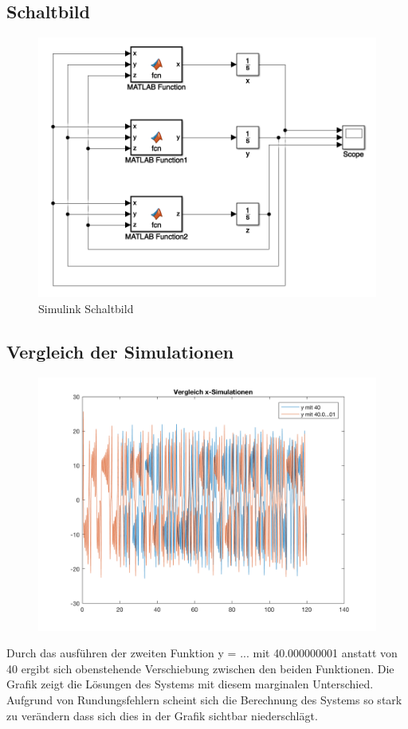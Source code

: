 \documentclass[]{scrartcl}
\begin{document}
\subsection{Schaltbild}
\begin{figure}[H]
	\centering
	\includegraphics[width=1\linewidth]{a1_3_schaltbild}
	\caption{Simulink Schaltbild}
	\label{fig:a1_3_schaltbild}
\end{figure}

\subsection{Vergleich der Simulationen}
\begin{figure}[H]
	\centering
	\includegraphics[width=1\linewidth]{a1_3_2}
	\caption{}
	\label{fig:a1_3_2}
\end{figure}

Durch das ausführen der zweiten Funktion y = ... mit 40.000000001 anstatt von 40 ergibt sich obenstehende Verschiebung zwischen den beiden Funktionen. Die Grafik zeigt die Lösungen des Systems mit diesem marginalen Unterschied. Aufgrund von Rundungsfehlern scheint sich die Berechnung des Systems so stark zu verändern dass sich dies in der Grafik sichtbar niederschlägt.
\end{document}

